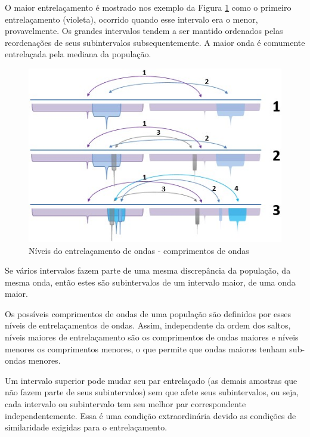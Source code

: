 O maior entrelaçamento é mostrado nos exemplo da Figura \ref{fig:consciousness_subconscious_entanglement} como o primeiro entrelaçamento (violeta), ocorrido quando esse intervalo era o menor, provavelmente. Os grandes intervalos tendem a ser mantido ordenados pelas reordenações de seus subintervalos subsequentemente. A maior onda é comumente entrelaçada pela mediana da população. 
	\begin{figure}[H]
	\caption{Níveis do entrelaçamento de ondas - comprimentos de ondas}
	\label{fig:consciousness_subconscious_entanglement}
	\centering
	\includegraphics[scale=.8]{sections/images/consciousness_subconscious_entanglement.jpg}
	\end{figure}

Se vários intervalos fazem parte de uma mesma discrepância da população, da mesma onda, então estes são subintervalos de um intervalo maior, de uma onda maior.

Os possíveis comprimentos de ondas de uma população são definidos por esses níveis de entrelaçamentos de ondas. Assim, independente da ordem dos saltos, níveis maiores de entrelaçamento são os comprimentos de ondas maiores e níveis menores os comprimentos menores, o que permite que ondas maiores tenham sub-ondas menores. 

Um intervalo superior pode mudar seu par entrelaçado (as demais amostras que não fazem parte de seus subintervalos) sem que afete seus subintervalos, ou seja, cada intervalo ou subintervalo tem seu melhor par correspondente independentemente. Essa é uma condição extraordinária devido as condições de similaridade exigidas para o entrelaçamento. 

